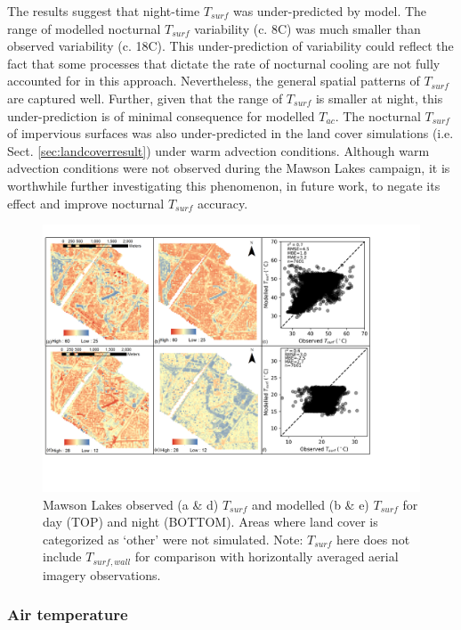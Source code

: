 \documentclass[gmd, manuscript]{copernicus}
\begin{document}
The results suggest that night-time $T_{surf}$ was under-predicted by model. The range of modelled nocturnal $T_{surf}$ variability (c. 8\degree C) was much smaller than observed variability (c. 18\degree C). This under-prediction of variability could reflect the fact that some processes that dictate the rate of nocturnal cooling are not fully accounted for in this approach. Nevertheless, the general spatial patterns of $T_{surf}$ are captured well. Further, given that the  range of $T_{surf}$ is smaller at night, this under-prediction is of minimal consequence for modelled $T_{ac}$. The nocturnal $T_{surf}$ of impervious surfaces was also under-predicted in the land cover simulations (i.e. Sect. \ref{sec:landcoverresult}) under warm advection conditions. Although warm advection conditions were not observed during the Mawson Lakes campaign, it is worthwhile further investigating this phenomenon, in future work, to negate its effect and improve nocturnal $T_{surf}$ accuracy. 


\begin{figure}
\includegraphics[width=1\textwidth]{figure5.png}
 \caption{Mawson Lakes  observed (a \& d) $T_{surf}$ and modelled (b \& e) $T_{surf}$ for day (TOP) and night (BOTTOM). Areas where land cover is categorized as `other' were not simulated. Note: $T_{surf}$ here does not include $T_{surf,wall}$ for comparison with horizontally averaged aerial imagery observations.} \label{fig:MawsonBase}
\end{figure}

 


\subsubsection*{Air temperature}\label{sec:airtempresult} 
\end{document}
